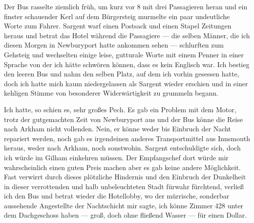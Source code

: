 Der Bus rasselte ziemlich früh, um kurz vor 8 mit drei Passagieren heran und ein finster schauender Kerl auf dem Bürgersteig murmelte ein paar undeutliche Worte zum Fahrer. Sargent warf einen Postsack und einen Stapel Zeitungen heraus und betrat das Hotel während die Passagiere --- die selben Männer, die ich diesen Morgen in Newburyport hatte ankommen sehen --- schlurften zum Gehsteig und wechselten einige leise, gutturale Worte mit einem Penner in einer Sprache von der ich hätte schwören können, dass es kein Englisch war. Ich bestieg den leeren Bus und nahm den selben Platz, auf dem ich vorhin gesessen hatte, doch ich hatte mich kaum niedergelassen als Sargent wieder erschien und in einer kehligen Stimme von besonderer Widerwärtigkeit zu grummeln begann.

Ich hatte, so schien es, sehr großes Pech. Es gab ein Problem mit dem Motor, trotz der gutgemachten Zeit von Newburyport aus und der Bus könne die Reise nach Arkham nicht vollenden. Nein, er könne weder bis Einbruch der Nacht repariert werden, noch gab es irgendeinen anderes Transportmittel aus Innsmouth heraus, weder nach Arkham, noch sonstwohin. Sargent entschuldigte sich, doch ich würde im Gilham einkehren müssen. Der Empfangschef dort würde mir wahrscheinlich einen guten Preis machen aber es gab keine andere Möglichkeit. Fast verwirrt durch dieses plötzliche Hindernis und den Einbruch der Dunkelheit in dieser verrottenden und halb unbeleuchteten Stadt fürwahr fürchtend, verließ ich den Bus und betrat wieder die Hotellobby, wo der mürrische, sonderbar aussehende Angestellte der Nachtschicht mir sagte, ich könne Zimmer 428 unter dem Dachgeschoss haben --- groß, doch ohne fließend Wasser --- für einen Dollar.
